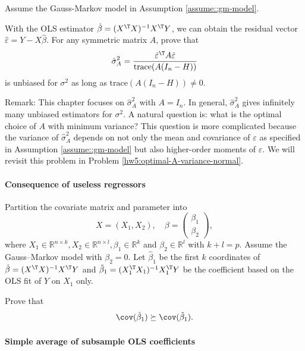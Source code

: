 Assume the Gauss-Markov model in Assumption \ref{assume::gm-model}. 



With the OLS estimator $\hat\beta = (X^{\T}X)^{-1} X^{\T} Y$, we can obtain the residual vector $\hat\varepsilon = Y - X\hat{\beta}$. For any symmetric matrix $A$, prove that
$$
\hat{\sigma}_A^2 =  \frac{ \hat\varepsilon^{\T} A \hat\varepsilon  }{  \text{trace}(A(I_n -  H))  } 
$$
is unbiased for $\sigma^2$ as long as $\text{trace}(A(I_n -  H)) \neq 0.$



Remark: This chapter focuses on  $\hat{\sigma}_A^2$ with $A = I_n$. In general, $\hat{\sigma}_A^2$ gives infinitely many unbiased estimators for $\sigma^2$. A natural question is: what is the optimal choice of $A$ with minimum variance? This question is more complicated because the variance of $\hat{\sigma}_A^2$ depends on not only the mean and covariance of $\varepsilon$ as specified in Assumption \ref{assume::gm-model} but also higher-order moments of $\varepsilon$. We will revisit this problem in Problem \ref{hw5:optimal-A-variance-normal}. 


 





\paragraph{Consequence of useless regressors}\label{hw4::useless-regressor}

Partition the covariate matrix and parameter into 
$$
X=(X_1, X_2),\quad \beta = \begin{pmatrix}
\beta_1\\
\beta_2
\end{pmatrix},
$$
where $X_1 \in \mathbb{R}^{n\times k}, X_2 \in \mathbb{R}^{n\times l}, \beta_1 \in \mathbb{R}^k$ and $\beta_2 \in \mathbb{R}^l$ with $k+l=p$. Assume the Gauss--Markov model with $\beta_2 = 0$. Let $\hat{\beta}_1$ be the first $k$ coordinates of $\hat{\beta} = (X^{\T}X)^{-1} X^{\T} Y$ and $\tilde{\beta}_1 = (X_1^{\T}X_1)^{-1} X_1^{\T} Y$ be the coefficient based on the OLS fit of $Y$ on $X_1$ only. 

Prove that 
$$
\cov(\hat{\beta}_1) \succeq \cov(\tilde{\beta}_1).
$$


 
 
 \paragraph{Simple average of subsample OLS coefficients}\label{hw4::average-subsample-ols}
 
